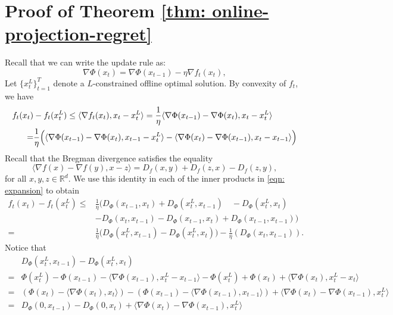 \section{Proof of Theorem \ref{thm: online-projection-regret}}
Recall that we can write the update rule as: 
\[ \nabla \Phi(x_t) = \nabla \Phi(x_{t-1}) - \eta \nabla f_t(x_t),\] 
Let $\{x_t^L\}_{t=1}^T$ denote a $L$-constrained offline optimal solution. By convexity of $f_t$, we have 
\begin{align} 
f_t(x_t) &- f_t(x_t^L) \le \langle \nabla f_t(x_t), x_t - x_t^L\rangle = \frac{1}{\eta} \langle \nabla \Phi(x_{t-1}) - \nabla \Phi(x_t) , x_t - x_t^L\rangle\notag \\
  = & \frac{1}{\eta}\Big(\langle \nabla \Phi(x_{t-1}) - \nabla \Phi(x_t), x_{t-1} - x_t^L \rangle - \langle \nabla \Phi(x_t) - \nabla\Phi(x_{t-1}), x_t - x_{t-1} \rangle \Big) 
  \label{eqn: expansion}
\end{align}
Recall that the Bregman divergence satisfies the equality
\[
\langle \nabla f(x) - \nabla f(y), x-z\rangle = D_f(x,y) + D_f(z, x) - D_f(z, y),
\]
for all $x, y, z \in \mathbb{R}^d$. We use this identity in each of the inner products in \eqref{eqn: expansion} to obtain
\begin{align*}
f_t(x_t) - f_t(x_t^L) 
\leq & \frac{1}{\eta} \Big(  D_\Phi(x_{t-1}, x_t) + D_\Phi(x_t^L, x_{t-1}) \quad - D_\Phi(x_t^L, x_t)  \\
& - D_\Phi(x_t, x_{t-1}) - D_\Phi(x_{t-1}, x_t) + D_\Phi(x_{t-1}, x_{t-1})     \Big) \\
= & \frac{1}{\eta} \Big( D_\Phi(x_t^L, x_{t-1}) - D_\Phi(x_t^L, x_t) \Big) - \frac{1}{\eta} (D_\Phi(x_t, x_{t-1})).
\end{align*}
Notice that 
\begin{align*}
  & D_\Phi(x_t^L, x_{t-1}) - D_\Phi(x_t^L, x_t) \\
= &\Phi(x_t^L) - \Phi(x_{t-1}) - \langle \nabla \Phi(x_{t-1}), x_t^L - x_{t-1}\rangle -\Phi(x_t^L) + \Phi(x_t) +  \langle \nabla\Phi(x_t) , x_t^L-x_t \rangle \\
= & (\Phi(x_t) - \langle \nabla \Phi(x_t), x_t \rangle) - (\Phi(x_{t-1}) - \langle \nabla \Phi(x_{t-1}),  x_{t-1} \rangle) + \langle \nabla \Phi(x_t) - \nabla \Phi(x_{t-1}), x_t^L \rangle \\
= & D_\Phi(0, x_{t-1}) - D_\Phi(0, x_t) + \langle \nabla \Phi(x_t) - \nabla \Phi(x_{t-1}), x_t^L \rangle
\end{align*}
